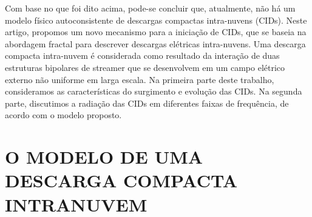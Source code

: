 \documentclass[a4paper, 12pt, onecolumn,singlespacing]{article}
\begin{document}
	Com base no que foi dito acima, pode-se concluir que, atualmente, não há um modelo físico autoconsistente de descargas compactas intra-nuvens (CIDs). Neste artigo, propomos um novo mecanismo para a iniciação de CIDs, que se baseia na abordagem fractal para descrever descargas elétricas intra-nuvens. Uma descarga compacta intra-nuvem é considerada como resultado da interação de duas estruturas bipolares de streamer que se desenvolvem em um campo elétrico externo não uniforme em larga escala. Na primeira parte deste trabalho, consideramos as características do surgimento e evolução das CIDs. Na segunda parte, discutimos a radiação das CIDs em diferentes faixas de frequência, de acordo com o modelo proposto.
	
	\section{O MODELO DE UMA DESCARGA COMPACTA INTRANUVEM}
	
\end{document}
